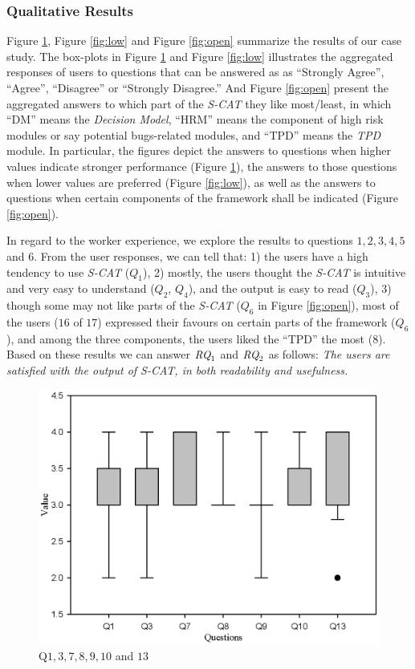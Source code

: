 \documentclass[10pt,conference]{IEEEtran}
\begin{document}
\subsubsection{Qualitative Results}

Figure \ref{fig:high}, Figure \ref{fig:low} and Figure \ref{fig:open} summarize the results of our case study.
The box-plots in Figure \ref{fig:high} and Figure \ref{fig:low} illustrates the aggregated responses of users to
questions that can be answered as as ``Strongly Agree'', ``Agree'', ``Disagree'' or ``Strongly Disagree.''
And Figure \ref{fig:open} present the aggregated answers to which part of the \emph{S-CAT} they like most/least, in
which ``DM'' means the \emph{Decision Model}, ``HRM'' means the component of high risk modules or say potential bugs-related modules,
and ``TPD'' means the \emph{TPD} module. In particular, the figures depict the answers to questions when higher values indicate stronger performance (Figure \ref{fig:high}),
the answers to those questions when lower values are preferred (Figure \ref{fig:low}), as well as the answers to questions
when certain components of the framework shall be indicated (Figure \ref{fig:open}).

In regard to the worker experience, we explore the results to questions $1, 2, 3, 4, 5$ and $6$. From the user responses,
we can tell that: 1) the users have a high tendency to use \emph{S-CAT} ($Q_1$), 2) mostly, the users thought the \emph{S-CAT}
is intuitive and very easy to understand ($Q_2$, $Q_4$), and the output is easy to read ($Q_3$), 3) though some may not
like parts of the \emph{S-CAT} ($Q_6$ in Figure \ref{fig:open}), most of the users ($16$ of $17$) expressed their favours on
certain parts of the framework ($Q_6$), and among the three components, the users liked the ``TPD'' the most ($8$).
Based on these results we can answer $\emph{RQ}_1$ and $\emph{RQ}_2$ as follows:
\emph{The users are satisfied with the output of \emph{S-CAT}, in both readability and usefulness.}


\begin{figure}[!htbp]
\centering
\includegraphics[width=0.63\columnwidth]{Figure/highanswer}
\caption{Q$1, 3, 7, 8, 9, 10$ and $13$}
\label{fig:high}
\end{figure}
\end{document}
